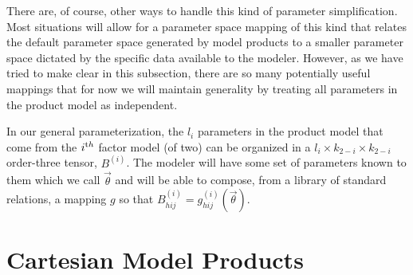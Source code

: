 

There are, of course, other ways to handle this kind of parameter simplification. Most situations will allow for a parameter space mapping of this kind that relates the default parameter space generated by model products to a smaller parameter space dictated by the specific data available to the modeler. However, as we have tried to make clear in this subsection, there are so many potentially useful mappings that for now we will maintain generality by treating all parameters in the product model as independent.

In our general parameterization, the $l_i$ parameters in the product model that come from the $i^{\textrm th}$ factor model (of two) can be organized in a $l_i \times k_{2-i} \times k_{2-i}$ order-three tensor, $B^{(i)}$. The modeler will have some set of parameters known to them which we call $\vec{\theta}$ and will be able to compose, from a library of standard relations, a mapping $g$ so that $B_{hij}^{(i)} = g_{hij}^{(i)}(\vec{\theta})$.

\section{Cartesian Model Products}\label{worden}

